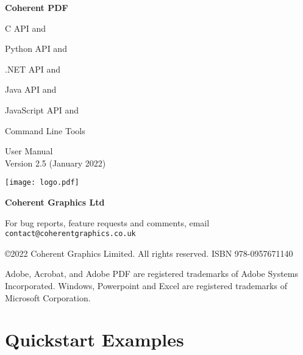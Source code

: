 \documentclass{book}
\newcommand{\smallgap}{\bigskip}
\begin{document}
\frontmatter
\pagestyle{empty}


\begin{flushright}


{\sffamily \bfseries \Huge Coherent PDF

\vspace{2mm}
\begin{cpdflib}
C API and 
\end{cpdflib}
\begin{pycpdflib}
Python API and
\end{pycpdflib}
\begin{dotnetcpdflib}
.NET API and
\end{dotnetcpdflib}
\begin{jcpdflib}
Java API and
\end{jcpdflib}
\begin{jscpdflib}
JavaScript API and
\end{jscpdflib}
Command Line Tools}

\vspace{12mm}

{\Huge User Manual}\\
Version 2.5 (January 2022)

\vspace{25mm}

\vfill
\ifdefined\HCode
\else
\texttt{[image: logo.pdf]}
\fi


\vspace{2mm}
{\sffamily \bfseries \LARGE Coherent Graphics Ltd}

\end{flushright}

\clearpage

\pagestyle{empty}
\noindent For bug reports, feature requests and comments, email\\ \texttt{contact@coherentgraphics.co.uk}

\vspace*{\fill}
\noindent\copyright 2022 Coherent Graphics Limited. All rights reserved. ISBN 978-0957671140

\smallgap 
\noindent Adobe, Acrobat, and Adobe PDF are
registered trademarks of Adobe Systems Incorporated. Windows, Powerpoint and
Excel are registered trademarks of Microsoft Corporation.

\cleardoublepage

\pagestyle{plain}
\chapter*{Quickstart Examples}
\end{document}
